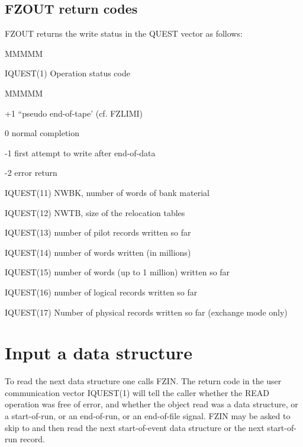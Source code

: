 \subsection{FZOUT return codes}
\par FZOUT returns the write status in the QUEST vector as follows:
\begin{DL}{MMMMM}
\item[IQUEST(1)
]Operation status code
\begin{DL}{MMMMM}
\item[+1
]``pseudo end-of-tape' (cf. FZLIMI)
\item[ 0
]normal completion
\item[-1
]first attempt to write after end-of-data
\item[-2
]error return
\end{DL}
\par
\item[IQUEST(11)
]NWBK, number of words of bank material
\item[IQUEST(12)
]NWTB, size of the relocation tables
\item[IQUEST(13)
]number of pilot records written so far
\item[IQUEST(14)
]number of words written (in millions)
\item[IQUEST(15)
]number of words (up to 1 million) written so far
\item[IQUEST(16)
]number of logical records written so far
\item[IQUEST(17)
]Number of physical records written so far (exchange mode only)
\end{DL}
\section{Input a data structure}
\par To read the next data structure one calls FZIN.
The return code in the user communication vector
IQUEST(1) will tell the caller whether
the READ operation was free of error, and whether the
object read was a data structure, or a start-of-run,
or an end-of-run,
or an end-of-file signal.
FZIN may be asked to skip to and then read the next start-of-event
data structure or the next start-of-run record.
